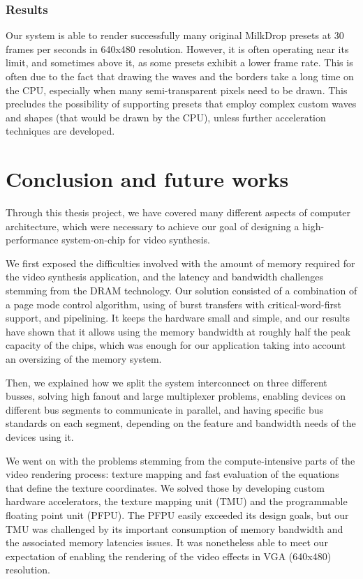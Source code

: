\documentclass[a4paper,11pt]{kthesis}
\begin{document}
\subsection{Results}
Our system is able to render successfully many original MilkDrop presets at 30 frames per seconds in 640x480 resolution. However, it is often operating near its limit, and sometimes above it, as some presets exhibit a lower frame rate. This is often due to the fact that drawing the waves and the borders take a long time on the CPU, especially when many semi-transparent pixels need to be drawn. This precludes the possibility of supporting presets that employ complex custom waves and shapes (that would be drawn by the CPU), unless further acceleration techniques are developed.

\chapter{Conclusion and future works}
\label{ch:conclusion}
Through this thesis project, we have covered many different aspects of computer architecture, which were necessary to achieve our goal of designing a high-performance system-on-chip for video synthesis.

We first exposed the difficulties involved with the amount of memory required for the video synthesis application, and the latency and bandwidth challenges stemming from the DRAM technology. Our solution consisted of a combination of a page mode control algorithm, using of burst transfers with critical-word-first support, and pipelining. It keeps the hardware small and simple, and our results have shown that it allows using the memory bandwidth at roughly half the peak capacity of the chips, which was enough for our application taking into account an oversizing of the memory system.

Then, we explained how we split the system interconnect on three different busses, solving high fanout and large multiplexer problems, enabling devices on different bus segments to communicate in parallel, and having specific bus standards on each segment, depending on the feature and bandwidth needs of the devices using it.

We went on with the problems stemming from the compute-intensive parts of the video rendering process: texture mapping and fast evaluation of the equations that define the texture coordinates. We solved those by developing custom hardware accelerators, the texture mapping unit (TMU) and the programmable floating point unit (PFPU). The PFPU easily exceeded its design goals, but our TMU was challenged by its important consumption of memory bandwidth and the associated memory latencies issues. It was nonetheless able to meet our expectation of enabling the rendering of the video effects in VGA (640x480) resolution.
\end{document}
